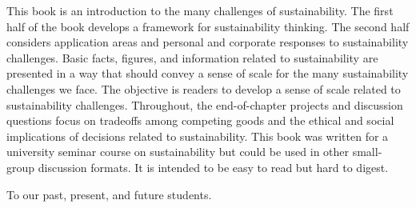 \ABSTRACT
\noindent
This book is an introduction to the many challenges of sustainability.
The first half of the book develops a framework for sustainability thinking.
The second half considers application areas and personal and corporate responses
to sustainability challenges.
Basic facts, figures, and information related to sustainability are presented
in a way that should convey a sense of scale for the many sustainability challenges
we face.
The objective is readers to develop a sense of scale related to sustainability challenges.
Throughout, the end-of-chapter projects and discussion questions focus on tradeoffs among 
competing goods and the ethical and social implications of decisions related to
sustainability.
This book was written for a university seminar course on sustainability but could
be used in other small-group discussion formats. 
It is intended to be easy to read but hard to digest.


\vfill

\cleardoublepage




{
\clearpage
\thispagestyle{plain}

\vspace*{13pc}\Large\it
\centerline{To our past, present, and future students.}
}

\cleardoublepage
 



{
\pagestyle{plain}
\tableofcontents
}

\cleardoublepage
 
 
 
 

